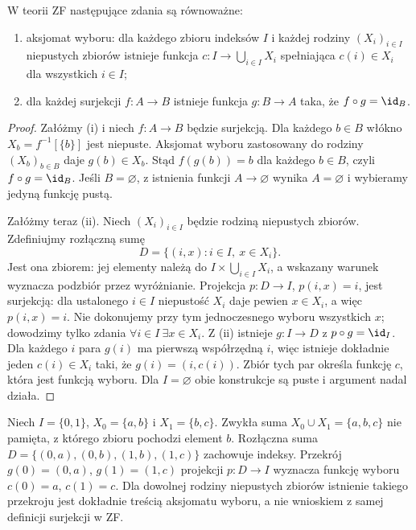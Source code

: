 \begin{twierdzenie}
\label{thm:surjections-sections-ac-lxvi}
W teorii ZF następujące zdania są równoważne:
\begin{enumerate}[label=(\roman*)]
\item aksjomat wyboru: dla każdego zbioru indeksów $I$ i każdej
rodziny $(X_i)_{i\in I}$ niepustych zbiorów istnieje funkcja $c:I\to\bigcup_{i\in I}X_i$
spełniająca $c(i)\in X_i$ dla wszystkich $i\in I$;
\item dla każdej surjekcji $f:A\to B$ istnieje funkcja
$g:B\to A$ taka, że $f\circ g=\id_B$.
\end{enumerate}
\end{twierdzenie}
\begin{proof}
Załóżmy (i) i niech $f:A\to B$ będzie surjekcją.
Dla każdego $b\in B$ włókno $X_b=f^{-1}[\{b\}]$ jest
niepuste. Aksjomat wyboru zastosowany do rodziny
$(X_b)_{b\in B}$ daje $g(b)\in X_b$. Stąd
$f(g(b))=b$ dla każdego $b\in B$, czyli $f\circ g=\id_B$.
Jeśli $B=\varnothing$, z istnienia funkcji $A\to\varnothing$
wynika $A=\varnothing$ i wybieramy jedyną funkcję pustą.

Załóżmy teraz (ii). Niech $(X_i)_{i\in I}$ będzie rodziną
niepustych zbiorów. Zdefiniujmy rozłączną sumę
\[
 D=\{(i,x):i\in I,\ x\in X_i\}.
\]
Jest ona zbiorem: jej elementy należą do
$I\times\bigcup_{i\in I}X_i$, a wskazany warunek
wyznacza podzbiór przez wyróżnianie. Projekcja
$p:D\to I$, $p(i,x)=i$, jest surjekcją: dla ustalonego
$i\in I$ niepustość $X_i$ daje pewien $x\in X_i$,
a więc $p(i,x)=i$. Nie dokonujemy przy tym jednoczesnego
wyboru wszystkich $x$; dowodzimy tylko zdania
$\forall i\in I\ \exists x\in X_i$.
Z (ii) istnieje $g:I\to D$ z $p\circ g=\id_I$.
Dla każdego $i$ para $g(i)$ ma pierwszą współrzędną $i$,
więc istnieje dokładnie jeden $c(i)\in X_i$ taki, że
$g(i)=(i,c(i))$. Zbiór tych par określa funkcję $c$,
która jest funkcją wyboru. Dla $I=\varnothing$ obie
konstrukcje są puste i argument nadal działa.
\end{proof}
\begin{przyklad}
Niech $I=\{0,1\}$, $X_0=\{a,b\}$ i $X_1=\{b,c\}$.
Zwykła suma $X_0\cup X_1=\{a,b,c\}$ nie pamięta,
z którego zbioru pochodzi element $b$. Rozłączna suma
$D=\{(0,a),(0,b),(1,b),(1,c)\}$ zachowuje indeksy.
Przekrój $g(0)=(0,a)$, $g(1)=(1,c)$ projekcji
$p:D\to I$ wyznacza funkcję wyboru $c(0)=a$, $c(1)=c$.
Dla dowolnej rodziny niepustych zbiorów istnienie takiego
przekroju jest dokładnie treścią aksjomatu wyboru, a nie
wnioskiem z samej definicji surjekcji w ZF.
\end{przyklad}

